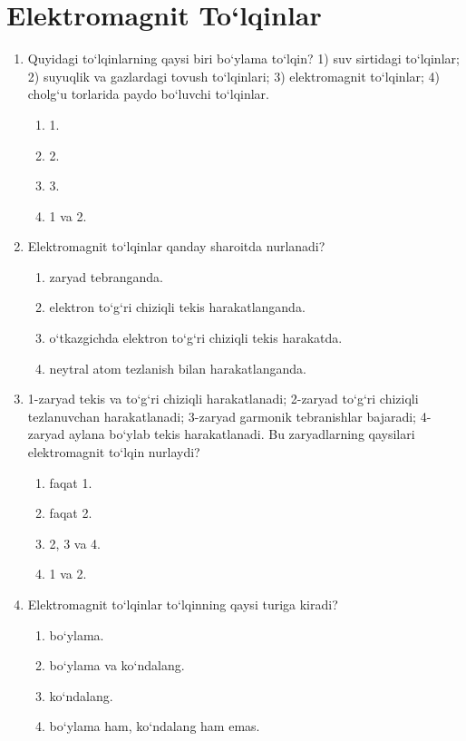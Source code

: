 \section{Elektromagnit To`lqinlar}

\begin{enumerate}

\item Quyidagi to‘lqinlarning qaysi biri bo‘ylama to‘lqin?
1) suv sirtidagi to‘lqinlar; 2) suyuqlik va gazlardagi tovush to‘lqinlari; 3) elektromagnit to‘lqinlar; 4) cholg‘u torlarida paydo bo‘luvchi to‘lqinlar.
\begin{enumerate}[label=\Alph*)]
\item 1.
\item 2.
\item 3.
\item 1 va 2.
\end{enumerate}

\item Elektromagnit to‘lqinlar qanday sharoitda nurlanadi?
\begin{enumerate}[label=\Alph*)]
\item zaryad tebranganda.
\item elektron to‘g‘ri chiziqli tekis harakatlanganda.
\item o‘tkazgichda elektron to‘g‘ri chiziqli tekis harakatda.
\item neytral atom tezlanish bilan harakatlanganda.
\end{enumerate}

\item 1-zaryad tekis va to‘g‘ri chiziqli harakatlanadi; 2-zaryad to‘g‘ri chiziqli tezlanuvchan harakatlanadi; 3-zaryad garmonik tebranishlar bajaradi; 4-zaryad aylana bo‘ylab tekis harakatlanadi. Bu zaryadlarning qaysilari elektromagnit to‘lqin nurlaydi?
\begin{enumerate}[label=\Alph*)]
\item faqat 1.
\item faqat 2.
\item 2, 3 va 4.
\item 1 va 2.
\end{enumerate}

\item Elektromagnit to‘lqinlar to‘lqinning qaysi turiga kiradi?
\begin{enumerate}[label=\Alph*)]
\item bo‘ylama.
\item bo‘ylama va ko‘ndalang.
\item ko‘ndalang.
\item bo‘ylama ham, ko‘ndalang ham emas.
\end{enumerate}


\end{enumerate}
